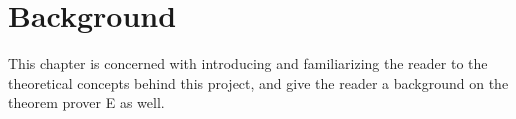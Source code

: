 \chapter{Background}\label{chap:background}

This chapter is concerned with introducing and familiarizing the reader to the theoretical concepts behind this project, and give the reader a background on the theorem prover E as well.




